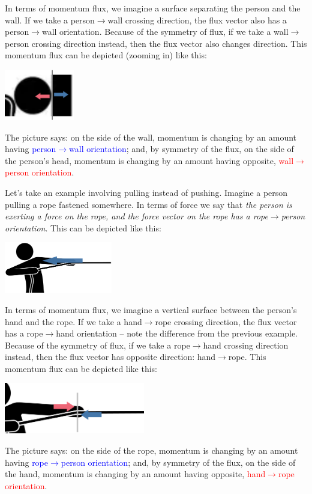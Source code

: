 \documentclass[a4paper,12pt,%
onecolumn,oneside,titlepage,%
british%
]{memoir}
\renewcommand*{\|}[1][]{\nonscript\:#1\vert\nonscript\:\mathopen{}}
\begin{document}
In terms of momentum flux, we imagine a surface separating the person and the wall. If we take a person$\rightarrow$wall crossing direction, the flux vector also has a person$\rightarrow$wall orientation. Because of the symmetry of flux, if we take a wall$\rightarrow$person crossing direction instead, then the flux vector also changes direction. This momentum flux can be depicted (zooming in) like this:\noprelistbreak
\begin{center}
  \includegraphics[height=6em]{person_push_flux.pdf}
\end{center}
The picture says: on the side of the wall, momentum is changing by an amount having \textcolor{blue}{person$\rightarrow$wall orientation}; and, by symmetry of the flux,  on the side of the person's head, momentum is changing by an amount having opposite, \textcolor{red}{wall$\rightarrow$person orientation}.

\medskip

Let's take an example involving pulling instead of pushing. Imagine a person pulling a rope fastened somewhere. In terms of force we say that
\emph{the person is exerting a force on the rope,
  and the force vector on the rope has a rope$\rightarrow$person orientation}. This can be depicted like this:\noprelistbreak
\begin{center}
    \includegraphics[height=6em]{person_pull_force.pdf}
\end{center}

In terms of momentum flux, we imagine a vertical surface between the person's hand and the rope. If we take a hand$\rightarrow$rope crossing direction, the flux vector has a rope$\rightarrow$hand orientation -- note the difference from the previous example. Because of the symmetry of flux, if we take a rope$\rightarrow$hand crossing direction instead, then the flux vector has opposite direction: hand$\rightarrow$rope. This momentum flux can be depicted like this:\noprelistbreak
\begin{center}
  \includegraphics[height=6em]{person_pull_flux.pdf}
\end{center}
The picture says: on the side of the rope, momentum is changing by an amount having \textcolor{blue}{rope$\rightarrow$person orientation}; and, by symmetry of the flux,  on the side of the hand, momentum is changing by an amount having opposite, \textcolor{red}{hand$\rightarrow$rope orientation}.
\end{document}
